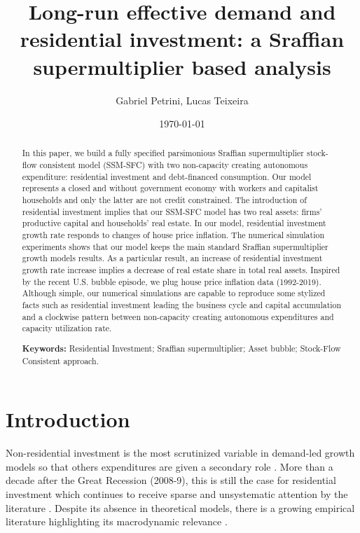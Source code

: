 \documentclass[11pt]{article}
\author{Gabriel Petrini, Lucas Teixeira}
\date{\today}
\title{Long-run effective demand and residential investment: a Sraffian supermultiplier based analysis}
\begin{document}
\maketitle
\begin{abstract}
In this paper, we build a fully specified parsimonious Sraffian supermultiplier stock-flow consistent model (SSM-SFC) with two non-capacity creating autonomous expenditure: residential investment and debt-financed consumption.
Our model represents a closed and without government economy with workers and capitalist households and only the latter are not credit constrained.
The introduction of residential investment implies that our SSM-SFC model has two real assets: firms' productive capital and households' real estate.
In our model, residential investment growth rate responds to changes of house price inflation.
The numerical simulation experiments shows that our model keeps the main standard Sraffian supermultiplier growth models results.
As a particular result, an increase of residential investment growth rate increase implies a decrease of real estate share in total real assets.
Inspired by the recent U.S. bubble episode, we plug house price inflation data (1992-2019).
Although simple, our numerical simulations are capable to reproduce some stylized facts such as residential investment leading the business cycle and capital accumulation and a clockwise pattern between non-capacity creating autonomous expenditures and capacity utilization rate.

\noindent \textbf{Keywords:} Residential Investment; Sraffian supermultiplier; Asset bubble;  Stock-Flow Consistent approach.
\end{abstract}


\section{Introduction}
\label{sec:org474bef7}
\label{sec:introduction}
Non-residential investment is the most scrutinized variable in demand-led growth models so that others expenditures are given a secondary role \cite{brochier_macroeconomics_2017}.
More than a decade after the Great Recession (2008-9), this is still the case for residential investment which continues to receive sparse and unsystematic attention by the literature \cites{caverzasi_stock-flow_2013}{nikolaidi_minsky_2017}.
Despite its absence in theoretical models, there is a growing empirical literature highlighting its macrodynamic relevance \cites{leamer_housing_2007}{jorda_great_2016}{fiebiger_semi-autonomous_2018}{fiebiger_trend_2017}.
\end{document}
